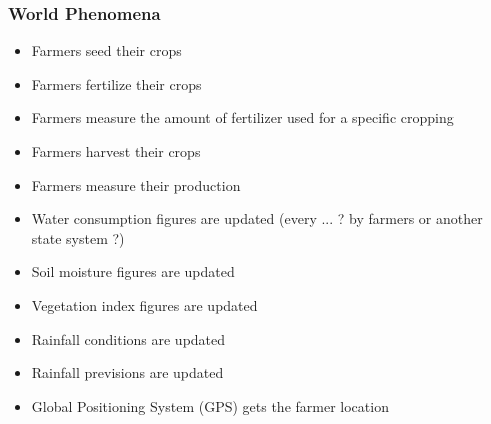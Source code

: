 \subsubsection{World Phenomena}
\begin{itemize}
	\item
	Farmers seed their crops
	\item
	Farmers fertilize their crops
	\item
	Farmers measure the amount of fertilizer used for a specific cropping
	\item
	Farmers harvest their crops
	\item
	Farmers measure their production
	\item
	Water consumption figures are updated (every ... ? by farmers or another state system ?)
	\item
	Soil moisture figures are updated
	\item
	Vegetation index figures are updated
	\item
	Rainfall conditions are updated
	\item
	Rainfall previsions are updated
	\item
	Global Positioning System (GPS) gets the farmer location
\end{itemize}

